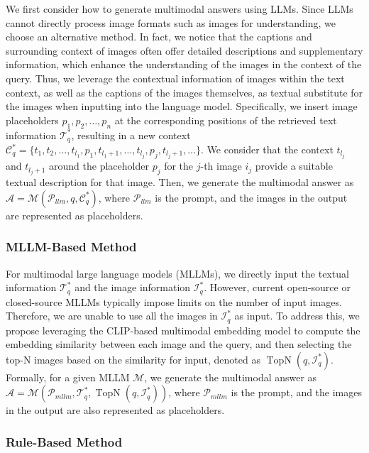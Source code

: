 We first consider how to generate multimodal answers using LLMs. Since LLMs cannot directly process image formats such as images for understanding, we choose an alternative method. 
In fact, we notice that the captions and surrounding context of images often offer detailed descriptions and supplementary information, which enhance the understanding of the images in the context of the query. Thus, we leverage the contextual information of images within the text context, as well as the captions of the images themselves, as textual substitute for the images when inputting into the language model. Specifically, we insert image placeholders $p_1, p_2, \dots, p_n$ at the corresponding positions of the retrieved text information $\mathcal{T}_q^*$, resulting in a new context $\mathcal{C}_q^* = \{t_1, t_2, \dots, t_{l_1}, p_1, t_{l_1 + 1}, \dots, t_{l_j}, p_j, t_{l_j +1}, \dots\}$. We consider that the context $t_{l_j}$ and $t_{l_j + 1}$ around the placeholder $p_j$ for the $j$-th image $i_j$ provide a suitable textual description for that image. Then, we generate the multimodal answer as $\mathcal{A} = \mathcal{M}(\mathcal{P}_{llm}, q, \mathcal{C}_q^{*})$, where $\mathcal{P}_{llm}$ is the prompt, and the images in the output are represented as placeholders.

\subsubsection{MLLM-Based Method}

For multimodal large language models (MLLMs), we directly input the textual information $\mathcal{T}_q^{*}$ and the image information $\mathcal{I}_q^{*}$. However, current open-source or closed-source MLLMs typically impose limits on the number of input images. Therefore, we are unable to use all the images in $\mathcal{I}_q^{*}$ as input. To address this, we propose leveraging the CLIP-based multimodal embedding model \citep{koukounas2024jina} to compute the embedding similarity between each image and the query, and then selecting the top-N images based on the similarity for input, denoted as $\operatorname{TopN}(q, \mathcal{I}_q^*)$. Formally, for a given MLLM $\mathcal{M}$, we generate the multimodal answer as $\mathcal{A} = \mathcal{M}(\mathcal{P}_{mllm}, \mathcal{T}_q^{*}, \operatorname{TopN}(q, \mathcal{I}_q^*))$, where $\mathcal{P}_{mllm}$ is the prompt, and the images in the output are also represented as placeholders.

\subsubsection{Rule-Based Method}

